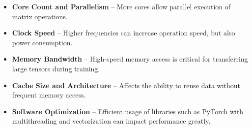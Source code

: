 \begin{itemize}
    \item \textbf{Core Count and Parallelism} – More cores allow parallel execution of matrix 
    operations. %

    \item \textbf{Clock Speed} – Higher frequencies can increase operation speed, but also power 
    consumption. %

    \item \textbf{Memory Bandwidth} – High-speed memory access is critical for transferring large 
    tensors during training. %

    \item \textbf{Cache Size and Architecture} – Affects the ability to reuse data without frequent 
    memory access. %

    \item \textbf{Software Optimization} – Efficient usage of libraries such as PyTorch with 
    multithreading and vectorization can impact performance greatly. 
\end{itemize}
